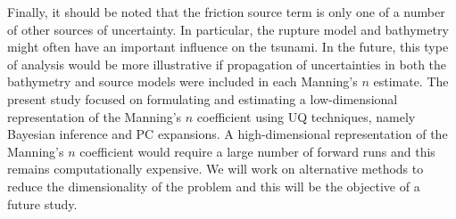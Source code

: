 \documentclass[review,12pt]{elsarticle}
\begin{document}
Finally, it should be noted that the friction source term is only one of a
number of other sources of uncertainty.  In particular, the rupture model and
bathymetry might often have an important influence on the tsunami.  
In the future, this type of analysis would be more illustrative if
propagation of uncertainties in both the bathymetry and source models were
included in each Manning's $n$ estimate.  The
present study focused on formulating and estimating a low-dimensional
representation of the Manning's $n$ coefficient using UQ techniques, namely
Bayesian inference and PC expansions.  A high-dimensional representation of the
Manning's $n$ coefficient would require a large number of forward runs and this remains
computationally expensive.  We will work on alternative methods to reduce the
dimensionality of the problem and this will be the objective of a future study.
\end{document}
